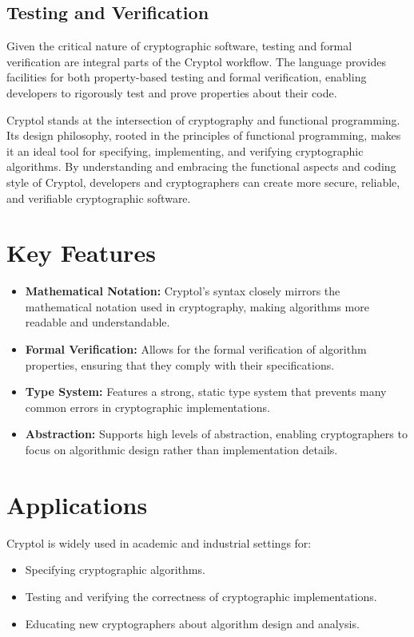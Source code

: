 \subsection*{Testing and Verification}
Given the critical nature of cryptographic software, testing and formal verification are integral parts of the Cryptol workflow. The language provides facilities for both property-based testing and formal verification, enabling developers to rigorously test and prove properties about their code.


Cryptol stands at the intersection of cryptography and functional programming. Its design philosophy, rooted in the principles of functional programming, makes it an ideal tool for specifying, implementing, and verifying cryptographic algorithms. By understanding and embracing the functional aspects and coding style of Cryptol, developers and cryptographers can create more secure, reliable, and verifiable cryptographic software.

\section*{Key Features}
\begin{itemize}
	\item \textbf{Mathematical Notation:} Cryptol's syntax closely mirrors the mathematical notation used in cryptography, making algorithms more readable and understandable.
	\item \textbf{Formal Verification:} Allows for the formal verification of algorithm properties, ensuring that they comply with their specifications.
	\item \textbf{Type System:} Features a strong, static type system that prevents many common errors in cryptographic implementations.
	\item \textbf{Abstraction:} Supports high levels of abstraction, enabling cryptographers to focus on algorithmic design rather than implementation details.
\end{itemize}

\section*{Applications}
Cryptol is widely used in academic and industrial settings for:
\begin{itemize}
	\item Specifying cryptographic algorithms.
	\item Testing and verifying the correctness of cryptographic implementations.
	\item Educating new cryptographers about algorithm design and analysis.
\end{itemize}


